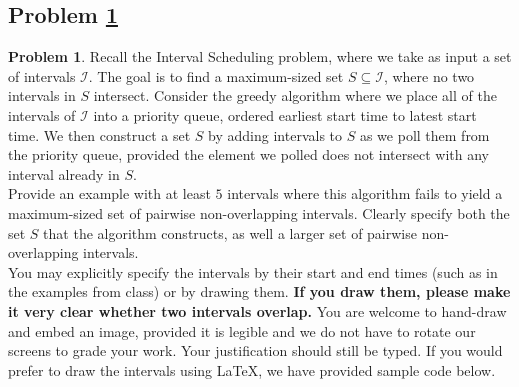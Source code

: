 \documentclass[11pt]{article}
\theoremstyle{definition}
\theoremstyle{definition}
\newtheorem{required}{Problem}
\theoremstyle{definition}
\begin{document}
\subsection{Problem \ref{GreedyFail1}}
\begin{required} \label{GreedyFail1}
Recall the \textsf{Interval Scheduling} problem, where we take as input a set of intervals $\mathcal{I}$. The goal is to find a maximum-sized set $S \subseteq \mathcal{I}$, where no two intervals in $S$ intersect. Consider the greedy algorithm where we place all of the intervals of $\mathcal{I}$ into a priority queue, ordered earliest start time to latest start time. We then construct a set $S$ by adding intervals to $S$ as we poll them from the priority queue, provided the element we polled does not intersect with any interval already in $S$. \\

\noindent Provide an example with at least $5$ intervals where this algorithm fails to yield a maximum-sized set of pairwise non-overlapping intervals. Clearly specify both the set $S$ that the algorithm constructs, as well a larger set of pairwise non-overlapping intervals. \\

\noindent You may explicitly specify the intervals by their start and end times (such as in the examples from class) or by drawing them. \textbf{If you draw them, please make it very clear whether two intervals overlap.} You are welcome to hand-draw and embed an image, provided it is legible and we do not have to rotate our screens to grade your work. Your justification should still be typed. If you would prefer to draw the intervals using \LaTeX, we have provided sample code below.
\end{required}
\end{document}
